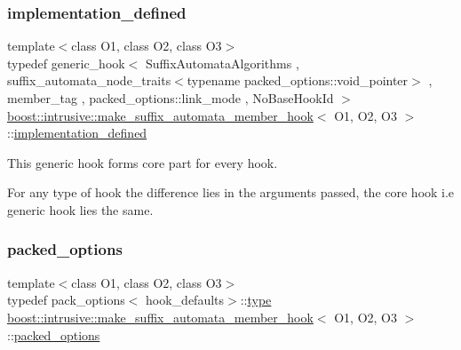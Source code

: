 \subsubsection{\texorpdfstring{implementation\+\_\+defined}{implementation\_defined}}
{\footnotesize\ttfamily template$<$class O1, class O2, class O3$>$ \\
typedef generic\+\_\+hook$<$ Suffix\+Automata\+Algorithms , suffix\+\_\+automata\+\_\+node\+\_\+traits$<$typename packed\+\_\+options\+::void\+\_\+pointer$>$ , member\+\_\+tag , packed\+\_\+options\+::link\+\_\+mode , No\+Base\+Hook\+Id $>$ \hyperlink{classboost_1_1intrusive_1_1make__suffix__automata__member__hook}{boost\+::intrusive\+::make\+\_\+suffix\+\_\+automata\+\_\+member\+\_\+hook}$<$ O1, O2, O3 $>$\+::\hyperlink{classboost_1_1intrusive_1_1make__suffix__automata__member__hook_aca176c172e71c868f0cbcfbd2d1d6577}{implementation\+\_\+defined}}


\begin{DoxyItemize}
\item This generic hook forms core part for every hook.  
\item For any type of hook the difference lies in the arguments passed, the core hook i.\+e generic hook lies the same. 
\end{DoxyItemize}\mbox{\label{classboost_1_1intrusive_1_1make__suffix__automata__member__hook_aa4b18a9fa9fc8cac2b6cb46a3cf806cb}} 
\subsubsection{\texorpdfstring{packed\+\_\+options}{packed\_options}}
{\footnotesize\ttfamily template$<$class O1, class O2, class O3$>$ \\
typedef pack\+\_\+options$<$ hook\+\_\+defaults$>$\+::\hyperlink{classboost_1_1intrusive_1_1make__suffix__automata__member__hook_a01166563956b1d994be6c34cba43efc1}{type} \hyperlink{classboost_1_1intrusive_1_1make__suffix__automata__member__hook}{boost\+::intrusive\+::make\+\_\+suffix\+\_\+automata\+\_\+member\+\_\+hook}$<$ O1, O2, O3 $>$\+::\hyperlink{classboost_1_1intrusive_1_1make__suffix__automata__member__hook_aa4b18a9fa9fc8cac2b6cb46a3cf806cb}{packed\+\_\+options}}

